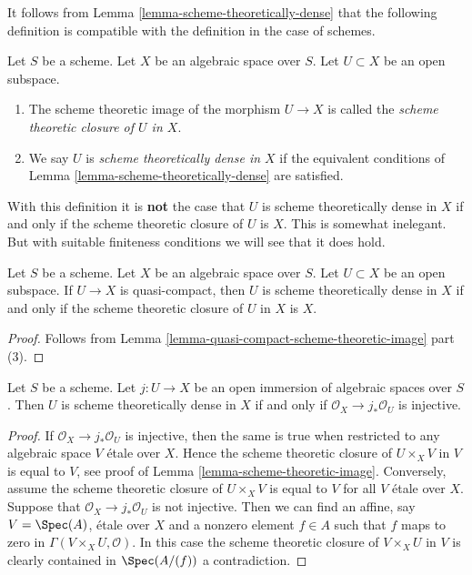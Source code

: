 \noindent
It follows from
Lemma \ref{lemma-scheme-theoretically-dense}
that the following definition is compatible with the definition
in the case of schemes.

\begin{definition}
\label{definition-scheme-theoretically-dense}
Let $S$ be a scheme.
Let $X$ be an algebraic space over $S$.
Let $U \subset X$ be an open subspace.
\begin{enumerate}
\item The scheme theoretic image of the morphism $U \to X$
is called the {\it scheme theoretic closure of $U$ in $X$}.
\item We say $U$ is {\it scheme theoretically dense in $X$}
if the equivalent conditions of
Lemma \ref{lemma-scheme-theoretically-dense} are satisfied.
\end{enumerate}
\end{definition}

\noindent
With this definition it is {\bf not} the case that $U$ is scheme
theoretically dense in $X$ if and only if the scheme theoretic closure
of $U$ is $X$. This is somewhat inelegant. But with suitable
finiteness conditions we will see that it does hold.

\begin{lemma}
\label{lemma-scheme-theoretically-dense-quasi-compact}
Let $S$ be a scheme. Let $X$ be an algebraic space over $S$.
Let $U \subset X$ be an open subspace.
If $U \to X$ is quasi-compact, then $U$
is scheme theoretically dense in $X$ if and only if the scheme theoretic
closure of $U$ in $X$ is $X$.
\end{lemma}

\begin{proof}
Follows from Lemma \ref{lemma-quasi-compact-scheme-theoretic-image} part (3).
\end{proof}

\begin{lemma}
\label{lemma-characterize-scheme-theoretically-dense}
Let $S$ be a scheme.
Let $j : U \to X$ be an open immersion of algebraic spaces over $S$.
Then $U$ is scheme theoretically dense in $X$ if and only if
$\mathcal{O}_X \to j_*\mathcal{O}_U$ is injective.
\end{lemma}

\begin{proof}
If $\mathcal{O}_X \to j_*\mathcal{O}_U$ is injective,
then the same is true when restricted to any
algebraic space $V$ \'etale over $X$.
Hence the scheme theoretic closure of $U \times_X V$ in $V$
is equal to $V$, see proof of
Lemma \ref{lemma-scheme-theoretic-image}.
Conversely, assume the scheme theoretic
closure of $U \times_X V$ is equal to $V$ for all $V$ \'etale over $X$.
Suppose that $\mathcal{O}_X \to j_*\mathcal{O}_U$ is not injective.
Then we can find an affine, say $V = \Spec(A)$, \'etale over $X$
and a nonzero element $f \in A$ such that $f$ maps to zero in
$\Gamma(V \times_X U, \mathcal{O})$. In this case the scheme theoretic
closure of $V \times_X U$ in $V$ is clearly contained in $\Spec(A/(f))$
a contradiction.
\end{proof}

